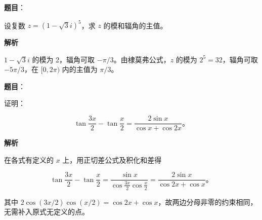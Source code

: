 \begin{answer}

\textbf{题目}：

设复数 $z=(1-\sqrt3 i)^5$，求 $z$ 的模和辐角的主值。

\textbf{解析}

$1-\sqrt3 i$ 的模为 2，辐角可取 $-\pi/3$。由棣莫弗公式，$z$ 的模为 $2^5=32$，辐角可取 $-5\pi/3$，在 $[0,2\pi)$ 内的主值为 $\pi/3$。


\end{answer}
\begin{answer}

\textbf{题目}：

证明：

\nopagebreak[4]
\[
\tan\frac{3x}{2}-\tan\frac{x}{2}=\frac{2\sin x}{\cos x+\cos2x}\text{。}
\]

\long{}
\long\edef\gkcurrentedition{\gkheadR}
\ifx\gkcurrentedition\gkquestionedition
\Needspace{0.65\textheight}
\fi

\textbf{解析}

在各式有定义的 $x$ 上，用正切差公式及积化和差得

\nopagebreak[4]
\[
\tan\frac{3x}{2}-\tan\frac{x}{2}
=\frac{\sin x}{\cos\frac{3x}{2}\cos\frac{x}{2}}
=\frac{2\sin x}{\cos2x+\cos x}\text{。}
\]

其中 $2\cos(3x/2)\cos(x/2)=\cos2x+\cos x$，故两边分母非零的约束相同，无需补入原式无定义的点。


\end{answer}
